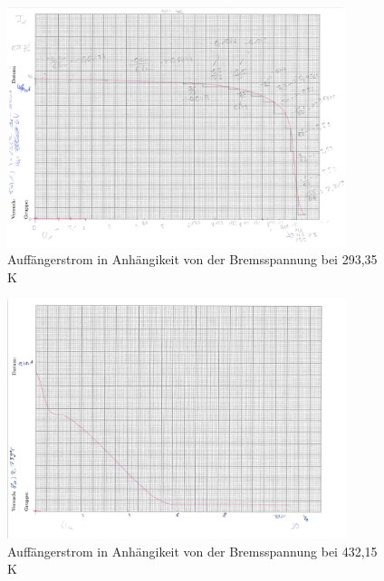   \begin{figure}
    \centering
    \includegraphics[height=7cm]{8a1.png}
    \caption{Auffängerstrom in Anhängikeit von der Bremsspannung bei 293,35 K}
    \label{fig:8a1}
  \end{figure}



\begin{figure}
  \centering
  \includegraphics[height=7cm]{8a2.png}
  \caption{Auffängerstrom in Anhängikeit von der Bremsspannung bei 432,15 K}
  \label{fig:8a2}
\end{figure}



